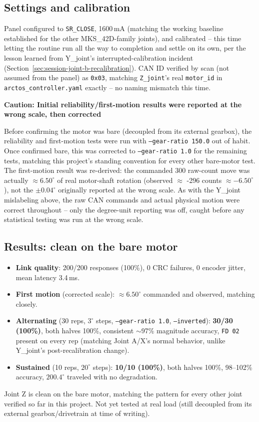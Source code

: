 \documentclass[11pt,letterpaper]{article}
\newenvironment{caution}[1]{%
    \par\addvspace{8pt}%
    \noindent{\color{cautionred}\rule{\linewidth}{0.8pt}}\par\vspace{2pt}
    \noindent\textbf{\color{cautionred}Caution: #1}\par\vspace{2pt}
}{%
    \par\vspace{2pt}\noindent{\color{cautionred}\rule{\linewidth}{0.4pt}}%
    \par\addvspace{8pt}%
}
\begin{document}
\subsection{Settings and calibration}
Panel configured to \texttt{SR\_CLOSE}, 1600\,mA (matching the working baseline established for the other MKS\_42D-family joints), and calibrated -- this time letting the routine run all the way to completion and settle on its own, per the lesson learned from Y\_joint's interrupted-calibration incident (Section~\ref{sec:session-joint-b-recalibration}). CAN ID verified by scan (not assumed from the panel) as \texttt{0x03}, matching \texttt{Z\_joint}'s real \texttt{motor\_id} in \texttt{arctos\_controller.yaml} exactly -- no naming mismatch this time.

\begin{caution}{Initial reliability/first-motion results were reported at the wrong scale, then corrected}
Before confirming the motor was bare (decoupled from its external gearbox), the reliability and first-motion tests were run with \texttt{--gear-ratio 150.0} out of habit. Once confirmed bare, this was corrected to \texttt{--gear-ratio 1.0} for the remaining tests, matching this project's standing convention for every other bare-motor test. The first-motion result was re-derived: the commanded 300 raw-count move was actually $\approx 6.50^\circ$ of real motor-shaft rotation (observed $\approx$ -296 counts $\approx -6.50^\circ$), not the $\pm 0.04^\circ$ originally reported at the wrong scale. As with the Y\_joint mislabeling above, the raw CAN commands and actual physical motion were correct throughout -- only the degree-unit reporting was off, caught before any statistical testing was run at the wrong scale.
\end{caution}

\subsection{Results: clean on the bare motor}
\begin{itemize}
    \item \textbf{Link quality}: 200/200 responses (100\%), 0 CRC failures, 0 encoder jitter, mean latency 3.4\,ms.
    \item \textbf{First motion} (corrected scale): $\approx 6.50^\circ$ commanded and observed, matching closely.
    \item \textbf{Alternating} (30 reps, $3^\circ$ steps, \texttt{--gear-ratio 1.0}, \texttt{--inverted}): \textbf{30/30 (100\%)}, both halves 100\%, consistent $\sim$97\% magnitude accuracy, \texttt{FD 02} present on every rep (matching Joint A/X's normal behavior, unlike Y\_joint's post-recalibration change).
    \item \textbf{Sustained} (10 reps, $20^\circ$ steps): \textbf{10/10 (100\%)}, both halves 100\%, 98--102\% accuracy, $200.4^\circ$ traveled with no degradation.
\end{itemize}
Joint Z is clean on the bare motor, matching the pattern for every other joint verified so far in this project. Not yet tested at real load (still decoupled from its external gearbox/drivetrain at time of writing).
\end{document}
